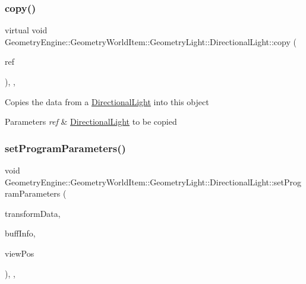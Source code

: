\subsubsection{\texorpdfstring{copy()}{copy()}}
{\footnotesize\ttfamily virtual void Geometry\+Engine\+::\+Geometry\+World\+Item\+::\+Geometry\+Light\+::\+Directional\+Light\+::copy (\begin{DoxyParamCaption}\item[{const \mbox{\hyperlink{class_geometry_engine_1_1_geometry_world_item_1_1_geometry_light_1_1_directional_light}{Directional\+Light}} \&}]{ref }\end{DoxyParamCaption})\hspace{0.3cm}{\ttfamily [inline]}, {\ttfamily [protected]}, {\ttfamily [virtual]}}

Copies the data from a \mbox{\hyperlink{class_geometry_engine_1_1_geometry_world_item_1_1_geometry_light_1_1_directional_light}{Directional\+Light}} into this object 
\begin{DoxyParams}{Parameters}
{\em ref} & \mbox{\hyperlink{class_geometry_engine_1_1_geometry_world_item_1_1_geometry_light_1_1_directional_light}{Directional\+Light}} to be copied \\
\hline
\end{DoxyParams}
\mbox{\label{class_geometry_engine_1_1_geometry_world_item_1_1_geometry_light_1_1_directional_light_a63668286e9b1cef5358c8d8f931a733c}} 
\subsubsection{\texorpdfstring{setProgramParameters()}{setProgramParameters()}}
{\footnotesize\ttfamily void Geometry\+Engine\+::\+Geometry\+World\+Item\+::\+Geometry\+Light\+::\+Directional\+Light\+::set\+Program\+Parameters (\begin{DoxyParamCaption}\item[{const \mbox{\hyperlink{class_geometry_engine_1_1_lighting_transformation_data}{Lighting\+Transformation\+Data}} \&}]{transform\+Data,  }\item[{const \mbox{\hyperlink{class_geometry_engine_1_1_buffers_info}{Buffers\+Info}} \&}]{buff\+Info,  }\item[{const Q\+Vector3D \&}]{view\+Pos }\end{DoxyParamCaption})\hspace{0.3cm}{\ttfamily [override]}, {\ttfamily [protected]}, {\ttfamily [virtual]}}


